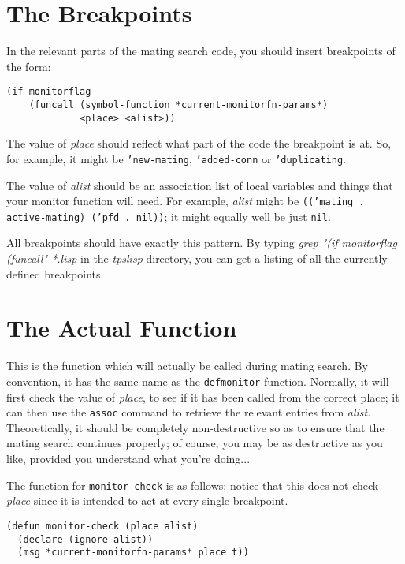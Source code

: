 \section{The Breakpoints}

In the relevant parts of the mating search code, you should insert breakpoints of the form:

\begin{verbatim}
(if monitorflag 
    (funcall (symbol-function *current-monitorfn-params*) 
             <place> <alist>))
\end{verbatim}

The value of {\it place} should reflect what part of the code the breakpoint is at. So, for example,
it might be {\tt 'new-mating}, {\tt 'added-conn} or {\tt 'duplicating}.

The value of {\it alist} should be an association list of local variables and things that your monitor
function will need. For example, {\it alist} might be {\tt (('mating . active-mating) ('pfd . nil))}; it might 
equally well be just {\tt nil}.

All breakpoints should have exactly this pattern. By typing {\it grep "(if monitorflag (funcall" *.lisp} in
the {\it tpslisp} directory, you can get a listing of all the currently defined breakpoints.

\section{The Actual Function}

This is the function which will actually be called during mating search. By convention, it has the
same name as the {\tt defmonitor} function. Normally, it will first check the value of {\it place}, to
see if it has been called from the correct place; it can then use the {\tt assoc} command to retrieve the
relevant entries from {\it alist}. Theoretically, it should be completely non-destructive so as to ensure 
that the mating search continues properly; of course, you may be as destructive as you like, provided 
you understand what you're doing...

The function for {\tt monitor-check} is as follows; notice that this does not check {\it place} since it 
is intended to act at every single breakpoint.

\begin{verbatim}
(defun monitor-check (place alist)
  (declare (ignore alist))
  (msg *current-monitorfn-params* place t)) 
\end{verbatim}

